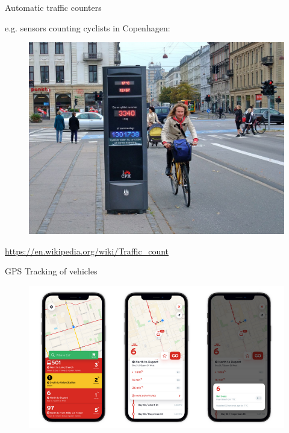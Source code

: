 \documentclass[aspectratio=169]{beamer}
\begin{document}
\begin{frame}
	
	Automatic traffic counters
	\vspace{2mm}
	
	e.g. sensors counting cyclists in Copenhagen:
	
	\begin{figure}
		\centering
		\includegraphics[width=0.7\linewidth]{images/bike_counter_copenhagen}
	\end{figure}
	
	\tiny\url{https://en.wikipedia.org/wiki/Traffic_count}
	
\end{frame}




\begin{frame}
	
	GPS Tracking of vehicles
	
	\begin{figure}
		\centering
		\includegraphics[width=0.7\linewidth]{images/transit_app}
	\end{figure}
	
\end{frame}
\end{document}
